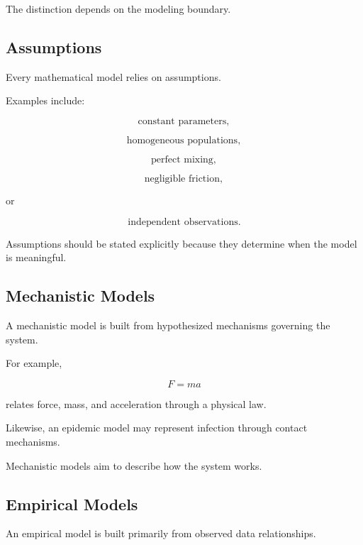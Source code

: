 The distinction depends on the modeling boundary.

\subsection{Assumptions}
\label{subsec:modeling-assumptions}

Every mathematical model relies on assumptions.

Examples include:

\[
\boxed{
\text{constant parameters},
}
\]

\[
\boxed{
\text{homogeneous populations},
}
\]

\[
\boxed{
\text{perfect mixing},
}
\]

\[
\boxed{
\text{negligible friction},
}
\]

or

\[
\boxed{
\text{independent observations}.
}
\]

Assumptions should be stated explicitly because they determine when the
model is meaningful.

\subsection{Mechanistic Models}
\label{subsec:mechanistic-models}

A mechanistic model is built from hypothesized mechanisms governing the
system.

For example,

\[
\boxed{
F=ma
}
\]

relates force, mass, and acceleration through a physical law.

Likewise, an epidemic model may represent infection through contact
mechanisms.

Mechanistic models aim to describe how the system works.

\subsection{Empirical Models}
\label{subsec:empirical-models}

An empirical model is built primarily from observed data relationships.

